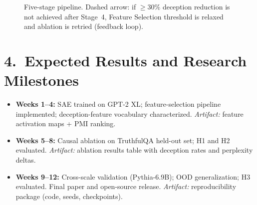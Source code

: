 \documentclass[11pt]{article}
\begin{document}
\begin{figure}[h]
\centering
{}
\caption{Five-stage pipeline. Dashed arrow: if $\geq$30\% deception reduction is not achieved after Stage~4, Feature Selection threshold is relaxed and ablation is retried (feedback loop).}
\label{fig:workflow}
\end{figure}

\section*{4.~Expected Results and Research Milestones}

\begin{itemize}
\item \textbf{Weeks 1–4:} SAE trained on GPT-2 XL; feature-selection pipeline implemented; deception-feature vocabulary characterized. \emph{Artifact:} feature activation maps + PMI ranking.
\item \textbf{Weeks 5–8:} Causal ablation on TruthfulQA held-out set; H1 and H2 evaluated. \emph{Artifact:} ablation results table with deception rates and perplexity deltas.
\item \textbf{Weeks 9–12:} Cross-scale validation (Pythia-6.9B); OOD generalization; H3 evaluated. Final paper and open-source release. \emph{Artifact:} reproducibility package (code, seeds, checkpoints).
\end{itemize}
\end{document}
